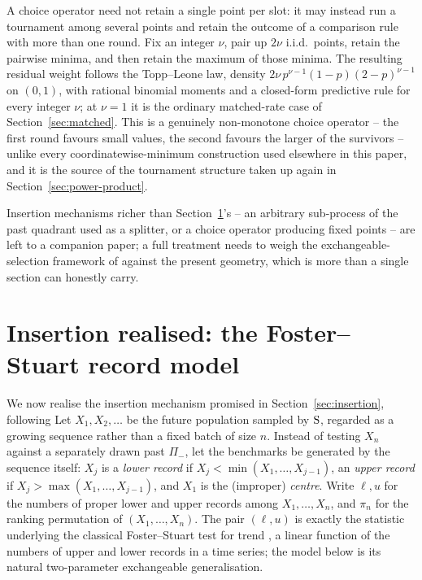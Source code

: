 \documentclass[11pt]{article}
\theoremstyle{plain}
\theoremstyle{definition}
\begin{document}
A choice operator need not retain a single point per slot: it may instead run a tournament among several points and retain the outcome of a comparison rule with more than one round. Fix an integer \(\nu\), pair up \(2\nu\) i.i.d.\ points, retain the pairwise minima, and then retain the maximum of those minima. The resulting residual weight follows the Topp--Leone law, density \(2\nu\,p^{\nu-1}(1-p)(2-p)^{\nu-1}\) on \((0,1)\), with rational binomial moments and a closed-form predictive rule for every integer \(\nu\); at \(\nu=1\) it is the ordinary matched-rate case of Section~\ref{sec:matched}. This is a genuinely non-monotone choice operator -- the first round favours small values, the second favours the larger of the survivors -- unlike every coordinatewise-minimum construction used elsewhere in this paper, and it is the source of the tournament structure taken up again in Section~\ref{sec:power-product}.

Insertion mechanisms richer than Section~\ref{sec:record-model}'s -- an arbitrary sub-process of the past quadrant used as a splitter, or a choice operator producing fixed points -- are left to a companion paper; a full treatment needs to weigh the exchangeable-selection framework of \cite{GnedinKrengel1996} against the present geometry, which is more than a single section can honestly carry.

\section{Insertion realised: the Foster--Stuart record model}
\label{sec:record-model}

We now realise the insertion mechanism promised in Section~\ref{sec:insertion}, following \cite{GnedinRecords2007,GnedinBiasedRecords2011}
Let \(X_1,X_2,\dots\) be the future population sampled by \({\rm S}\), regarded as a growing sequence rather than a fixed batch of size \(n\). Instead of testing \(X_n\) against a separately drawn past \(\Pi_-\), let the benchmarks be generated by the sequence itself: \(X_j\) is a \emph{lower record} if \(X_j<\min(X_1,\dots,X_{j-1})\), an \emph{upper record} if \(X_j>\max(X_1,\dots,X_{j-1})\), and \(X_1\) is the (improper) \emph{centre}. Write \(\ell,u\) for the numbers of proper lower and upper records among \(X_1,\dots,X_n\), and \(\pi_n\) for the ranking permutation of \((X_1,\dots,X_n)\). The pair \((\ell,u)\) is exactly the statistic underlying the classical Foster--Stuart test for trend \cite{FosterStuart1954}, a linear function of the numbers of upper and lower records in a time series; the model below is its natural two-parameter exchangeable generalisation.
\end{document}
